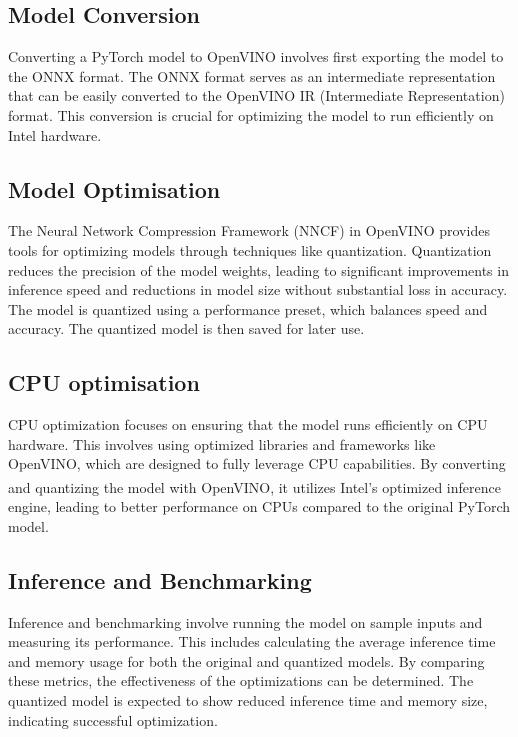 \documentclass{josis}
\begin{document}
\subsection{Model Conversion}
\begin{enumerate}
Converting a PyTorch model to OpenVINO involves first exporting the model to the ONNX format. The ONNX format serves as an intermediate representation that can be easily converted to the OpenVINO IR (Intermediate Representation) format. This conversion is crucial for optimizing the model to run efficiently on Intel hardware.
\end{enumerate}
\subsection{Model Optimisation}
\begin{enumerate}
The Neural Network Compression Framework (NNCF) in OpenVINO provides tools for optimizing models through techniques like quantization. Quantization reduces the precision of the model weights, leading to significant improvements in inference speed and reductions in model size without substantial loss in accuracy. The model is quantized using a performance preset, which balances speed and accuracy. The quantized model is then saved for later use.
\end{enumerate}
\subsection{CPU optimisation }
\begin{enumerate}
CPU optimization focuses on ensuring that the model runs efficiently on CPU hardware. This involves using optimized libraries and frameworks like OpenVINO, which are designed to fully leverage CPU capabilities. By converting and quantizing the model with OpenVINO, it utilizes Intel\textsuperscript{\textregistered}'s optimized inference engine, leading to better performance on CPUs compared to the original PyTorch model.
\end{enumerate}
\subsection{Inference and Benchmarking}
\begin{enumerate}
Inference and benchmarking involve running the model on sample inputs and measuring its performance. This includes calculating the average inference time and memory usage for both the original and quantized models. By comparing these metrics, the effectiveness of the optimizations can be determined. The quantized model is expected to show reduced inference time and memory size, indicating successful optimization.
\end{enumerate}
\end{document}

